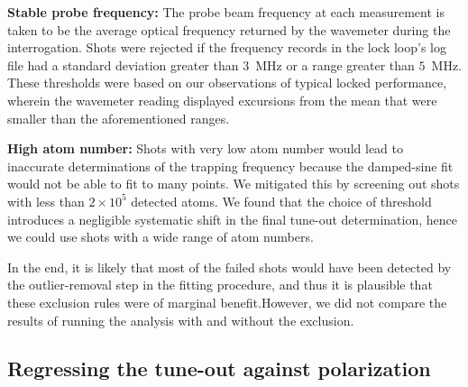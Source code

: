 	\textbf{Stable probe frequency:}		The probe beam frequency at each measurement is taken to be the average optical frequency returned by the wavemeter during the interrogation. Shots were rejected if the frequency records in the lock loop's log file had a standard deviation greater than $3$~MHz or a range greater than $5$~MHz. These thresholds were based on our observations of typical locked performance, wherein the wavemeter reading displayed excursions from the mean that were smaller than the aforementioned ranges.

	\textbf{High atom number:}		Shots with very low atom number would lead to inaccurate determinations of the trapping frequency because the damped-sine fit would not be able to fit to many points. We mitigated this by screening out shots with less than $2\times10^{5}$ detected atoms. We found that the choice of threshold introduces a negligible systematic shift in the final tune-out determination, hence we could use shots with a wide range of atom numbers.


	In the end, it is likely that most of the failed shots would have been detected by the outlier-removal step in the fitting procedure, and thus it is plausible that these exclusion rules were of marginal benefit.However, we did not compare the results of running the analysis with and without the exclusion.

\subsection{Regressing the tune-out against polarization}
 \label{sec:fitting}
	
	
